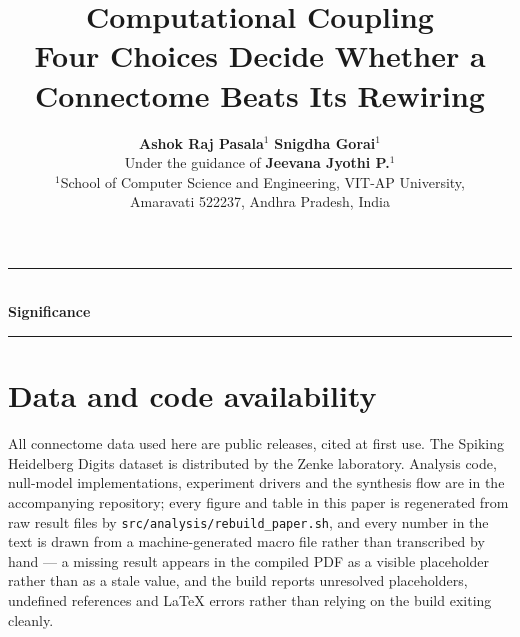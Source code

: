 \documentclass[10pt,twocolumn,letterpaper]{article}
\title{\textbf{Computational Coupling}\\[4pt]
\large\textbf{Four Choices Decide Whether a Connectome Beats Its Rewiring}}
\author{
  \textbf{Ashok Raj Pasala}$^{1}$ \quad \textbf{Snigdha Gorai}$^{1}$ \\[2pt]
  \small Under the guidance of \textbf{Jeevana Jyothi P.}$^{1}$ \\[4pt]
  \small $^{1}$School of Computer Science and Engineering, VIT-AP University,\\
  \small Amaravati 522237, Andhra Pradesh, India
}
\date{}
\begin{document}
\maketitle

\begin{abstract}

\end{abstract}

%
\vspace{6pt}
\noindent\begin{minipage}{\columnwidth}
\small
\setlength{\parskip}{4pt}\setlength{\parindent}{0pt}
\rule{\columnwidth}{0.6pt}\\[2pt]
\textbf{Significance}\par

\par\vspace{2pt}\rule{\columnwidth}{0.6pt}
\end{minipage}
\vspace{6pt}






\section*{Data and code availability}
All connectome data used here are public releases, cited at first use. The Spiking
Heidelberg Digits dataset is distributed by the Zenke laboratory. Analysis code,
null-model implementations, experiment drivers and the synthesis flow are in the
accompanying repository; every figure and table in this paper is regenerated from
raw result files by \texttt{src/analysis/rebuild\_paper.sh}, and every number in the
text is drawn from a machine-generated macro file rather than transcribed by hand ---
a missing result appears in the compiled PDF as a visible placeholder rather than as a
stale value, and the build reports unresolved placeholders, undefined references and
\LaTeX{} errors rather than relying on the build exiting cleanly.
\end{document}
